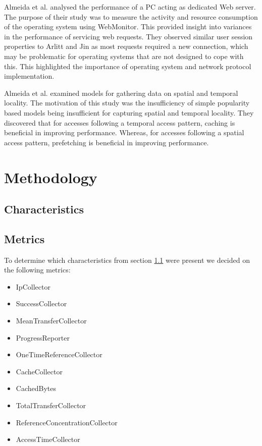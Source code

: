 \documentclass[10pt,conference]{IEEEtran}
\begin{document}
Almeida et al. \cite{almeida} analysed the performance of a PC acting as dedicated Web server. The purpose of their study was to measure the activity and resource consumption of the operating system using WebMonitor. This provided insight into variances in the performance of servicing web requests. They observed similar user session properties to Arlitt and Jin \cite{world_cup} as most requests required a new connection, which may be problematic for operating systems that are not designed to cope with this. This highlighted the importance of operating system and network protocol implementation.

Almeida et al. \cite{reference_locality} examined models for gathering data on spatial and temporal locality. The motivation of this study was the insufficiency of simple popularity based models being insufficient for capturing spatial and temporal locality. They discovered that for accesses following a temporal access pattern, caching is beneficial in improving performance. Whereas, for accesses following a spatial access pattern, prefetching is beneficial in improving performance.

\section{Methodology}\label{methodology}
\subsection{Characteristics}\label{lab:characteristics}
\subsection{Metrics}
To determine which characteristics from section \ref{lab:characteristics} were present we decided on the following metrics:
\begin{itemize}[noitemsep]
    \item IpCollector
    \item SuccessCollector
    \item MeanTransferCollector
    \item ProgressReporter
    \item OneTimeReferenceCollector
    \item CacheCollector
    \item CachedBytes
    \item TotalTransferCollector
    \item ReferenceConcentrationCollector
    \item AccessTimeCollector
\end{itemize}
\end{document}
